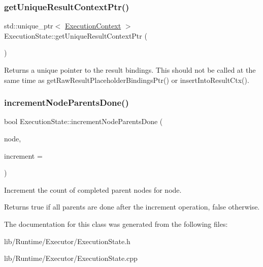 \subsubsection{\texorpdfstring{get\+Unique\+Result\+Context\+Ptr()}{getUniqueResultContextPtr()}}
{\footnotesize\ttfamily std\+::unique\+\_\+ptr$<$ \hyperlink{classglow_1_1_execution_context}{Execution\+Context} $>$ Execution\+State\+::get\+Unique\+Result\+Context\+Ptr (\begin{DoxyParamCaption}{ }\end{DoxyParamCaption})}

\begin{DoxyReturn}{Returns}
a unique pointer to the result bindings. This should not be called at the same time as get\+Raw\+Result\+Placeholder\+Bindings\+Ptr() or insert\+Into\+Result\+Ctx(). 
\end{DoxyReturn}
\mbox{\label{classglow_1_1runtime_1_1_execution_state_af80493d05caab1bf6a0a936269382828}} 
\subsubsection{\texorpdfstring{increment\+Node\+Parents\+Done()}{incrementNodeParentsDone()}}
{\footnotesize\ttfamily bool Execution\+State\+::increment\+Node\+Parents\+Done (\begin{DoxyParamCaption}\item[{const \hyperlink{structglow_1_1runtime_1_1_d_a_g_node}{D\+A\+G\+Node} $\ast$}]{node,  }\item[{unsigned}]{increment = {} }\end{DoxyParamCaption})}

Increment the count of completed parent nodes for {\ttfamily node}. \begin{DoxyReturn}{Returns}
true if all parents are done after the increment operation, false otherwise. 
\end{DoxyReturn}


The documentation for this class was generated from the following files\+:\begin{DoxyCompactItemize}
\item 
lib/\+Runtime/\+Executor/Execution\+State.\+h\item 
lib/\+Runtime/\+Executor/Execution\+State.\+cpp\end{DoxyCompactItemize}

